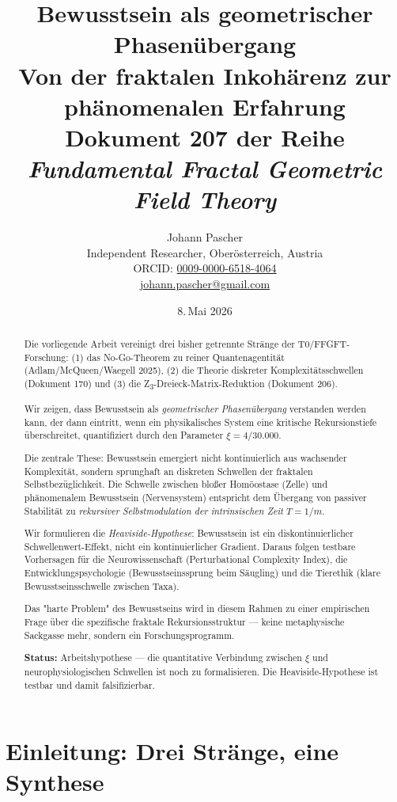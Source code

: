 \documentclass[11pt,a4paper]{article}
\title{\textbf{Bewusstsein als geometrischer Phasenübergang}\\
	\large Von der fraktalen Inkohärenz zur phänomenalen Erfahrung\\[2mm]
	\normalsize Dokument 207 der Reihe \emph{Fundamental Fractal Geometric Field Theory}}
\author{Johann Pascher\\
	\small Independent Researcher, Oberösterreich, Austria\\[1mm]
	\small ORCID: \href{https://orcid.org/0009-0000-6518-4064}{0009-0000-6518-4064}\\
	\small \href{mailto:johann.pascher@gmail.com}{johann.pascher@gmail.com}}
\date{8.\,Mai 2026}
\begin{document}
	\maketitle
	\thispagestyle{firstpage}
	
	\begin{abstract}
		\noindent
		Die vorliegende Arbeit vereinigt drei bisher getrennte Stränge der T0/FFGFT-Forschung: 
		(1) das No-Go-Theorem zu reiner Quantenagentität (Adlam/McQueen/Waegell 2025), 
		(2) die Theorie diskreter Komplexitätsschwellen (Dokument 170) und 
		(3) die Z\textsubscript{3}-Dreieck-Matrix-Reduktion (Dokument 206). 
		
		Wir zeigen, dass Bewusstsein als \emph{geometrischer Phasenübergang} verstanden werden kann, der dann eintritt, wenn ein physikalisches System eine kritische Rekursionstiefe überschreitet, quantifiziert durch den Parameter \(\xi = 4/30.000\). 
		
		Die zentrale These: Bewusstsein emergiert nicht kontinuierlich aus wachsender Komplexität, sondern sprunghaft an diskreten Schwellen der fraktalen Selbstbezüglichkeit. Die Schwelle zwischen bloßer Homöostase (Zelle) und phänomenalem Bewusstsein (Nervensystem) entspricht dem Übergang von passiver Stabilität zu \emph{rekursiver Selbstmodulation der intrinsischen Zeit} \(T = 1/m\).
		
		Wir formulieren die \emph{Heaviside-Hypothese}: Bewusstsein ist ein diskontinuierlicher Schwellenwert-Effekt, nicht ein kontinuierlicher Gradient. Daraus folgen testbare Vorhersagen für die Neurowissenschaft (Perturbational Complexity Index), die Entwicklungspsychologie (Bewusstseinssprung beim Säugling) und die Tierethik (klare Bewusstseinsschwelle zwischen Taxa).
		
		Das "harte Problem" des Bewusstseins wird in diesem Rahmen zu einer empirischen Frage über die spezifische fraktale Rekursionsstruktur — keine metaphysische Sackgasse mehr, sondern ein Forschungsprogramm.
		
		\vspace{2mm}
		\noindent
		\textbf{Status:} Arbeitshypothese — die quantitative Verbindung zwischen \(\xi\) und neurophysiologischen Schwellen ist noch zu formalisieren. Die Heaviside-Hypothese ist testbar und damit falsifizierbar.
	\end{abstract}
	
	\tableofcontents
	
	\clearpage
	
	\section{Einleitung: Drei Stränge, eine Synthese}
	\label{sec:einleitung}
	
\end{document}

